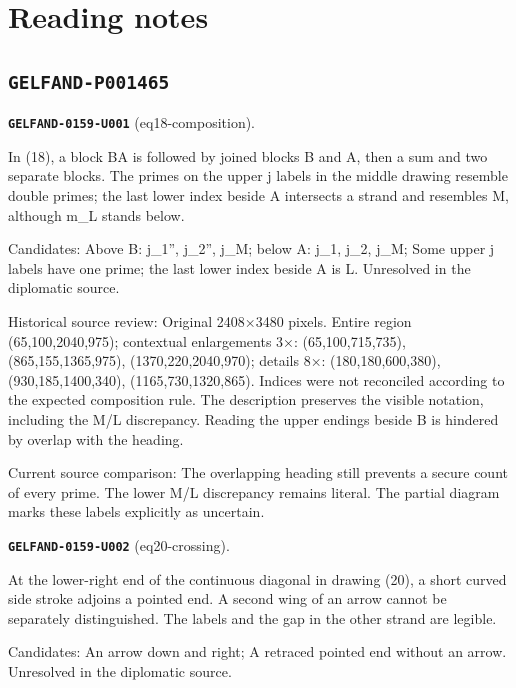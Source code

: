 \section*{Reading notes}
\subsection*{\texttt{GELFAND-P001465}}
\par\noindent\leavevmode{}\label{GELFAND-0159-U001}\label{GELFAND-P001465:eq18-composition}\textbf{\texttt{GELFAND-0159-U001}} (eq18-composition).\nopagebreak[4]\par
In (18), a block BA is followed by joined blocks B and A, then a sum and two separate blocks. The primes on the upper j labels in the middle drawing resemble double primes; the last lower index beside A intersects a strand and resembles M, although m\_L stands below.\par
Candidates: Above B: j\_1'', j\_2'', j\_M; below A: j\_1, j\_2, j\_M; Some upper j labels have one prime; the last lower index beside A is L. Unresolved in the diplomatic source.\par
Historical source review: Original 2408×3480 pixels. Entire region (65,100,2040,975); contextual enlargements 3×: (65,100,715,735), (865,155,1365,975), (1370,220,2040,970); details 8×: (180,180,600,380), (930,185,1400,340), (1165,730,1320,865). Indices were not reconciled according to the expected composition rule. The description preserves the visible notation, including the M/L discrepancy. Reading the upper endings beside B is hindered by overlap with the heading.\par
Current source comparison: The overlapping heading still prevents a secure count of every prime. The lower M/L discrepancy remains literal. The partial diagram marks these labels explicitly as uncertain.\par\medskip
\par\noindent\leavevmode{}\label{GELFAND-0159-U002}\label{GELFAND-P001465:eq20-crossing}\textbf{\texttt{GELFAND-0159-U002}} (eq20-crossing).\nopagebreak[4]\par
At the lower-right end of the continuous diagonal in drawing (20), a short curved side stroke adjoins a pointed end. A second wing of an arrow cannot be separately distinguished. The labels and the gap in the other strand are legible.\par
Candidates: An arrow down and right; A retraced pointed end without an arrow. Unresolved in the diplomatic source.\par
